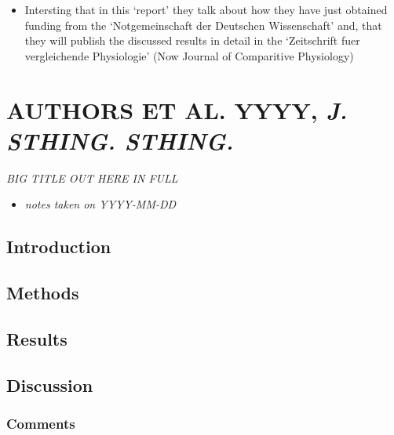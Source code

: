 \documentclass[
]{book}
\providecommand{\tightlist}{%
  \setlength{\itemsep}{0pt}\setlength{\parskip}{0pt}}
\begin{document}
\begin{itemize}
\tightlist
\item
  Intersting that in this `report' they talk about how they have just obtained funding from the `Notgemeinschaft der Deutschen Wissenschaft' and, that they will publish the discussed results in detail in the `Zeitschrift fuer vergleichende Physiologie' (Now Journal of Comparitive Physiology)
\end{itemize}

\hypertarget{authors-et-al.-yyyy-j.-sthing.-sthing.}{%
\chapter{\texorpdfstring{AUTHORS ET AL. YYYY, \emph{J. STHING. STHING.}}{AUTHORS ET AL. YYYY, J. STHING. STHING.}}\label{authors-et-al.-yyyy-j.-sthing.-sthing.}}


\emph{BIG TITLE OUT HERE IN FULL} \citep{schuchmannsiemers2010a}

\begin{itemize}
\tightlist
\item
  \emph{notes taken on YYYY-MM-DD}
\end{itemize}

\hypertarget{introduction}{%
\section{Introduction}\label{introduction}}

\hypertarget{methods}{%
\section{Methods}\label{methods}}

\hypertarget{results}{%
\section{Results}\label{results}}

\hypertarget{discussion}{%
\section{Discussion}\label{discussion}}

\hypertarget{comments}{%
\subsection{Comments}\label{comments}}

  
\end{document}
